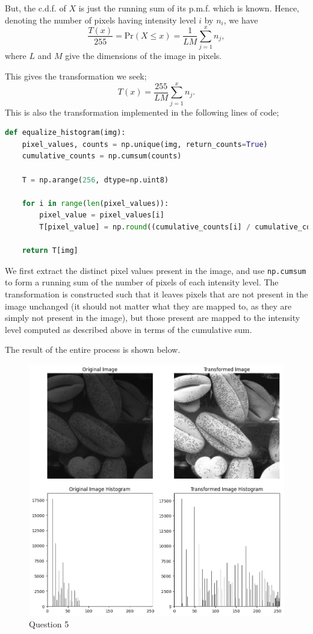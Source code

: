 \documentclass{article}[a4paper]
\begin{document}
\begin{enumerate}
	But, the c.d.f. of $X$ is just the running sum of its p.m.f. which is known. Hence, denoting the number of pixels having intensity
	level $i$ by $n_i$, we have \[
		\dfrac{T(x)}{255} = \text{Pr}\left( X \leq x \right) = \dfrac{1}{LM} \sum_{j = 1}^x n_j,
	\] where $L$ and $M$ give the dimensions of the image in pixels.
	
	This gives the transformation we seek; \[
		T(x) = \dfrac{255}{LM} \sum_{j = 1}^x n_j.
	\] This is also the transformation implemented in the following lines of code;
	\begin{lstlisting}[language=Python]
def equalize_histogram(img):
    pixel_values, counts = np.unique(img, return_counts=True)
    cumulative_counts = np.cumsum(counts)

    T = np.arange(256, dtype=np.uint8)

	for i in range(len(pixel_values)):
        pixel_value = pixel_values[i]
        T[pixel_value] = np.round((cumulative_counts[i] / cumulative_counts[-1]) * 255)

    return T[img]
	\end{lstlisting}
	We first extract the distinct pixel values present in the image, and use \lstinline|np.cumsum| to form a running sum of the number
	of pixels of each intensity level. The transformation is constructed such that it leaves pixels that are not present in the image
	unchanged (it should not matter what they are mapped to, as they are simply not present in the image), but those present are mapped
	to the intensity level computed as described above in terms of the cumulative sum.

	The result of the entire process is shown below.

	\begin{figure}[H]
		\centering
		\includegraphics[width=0.8\linewidth]{images/q5.png}
		\caption{Question 5}
	\end{figure}


\end{enumerate}
\end{document}
